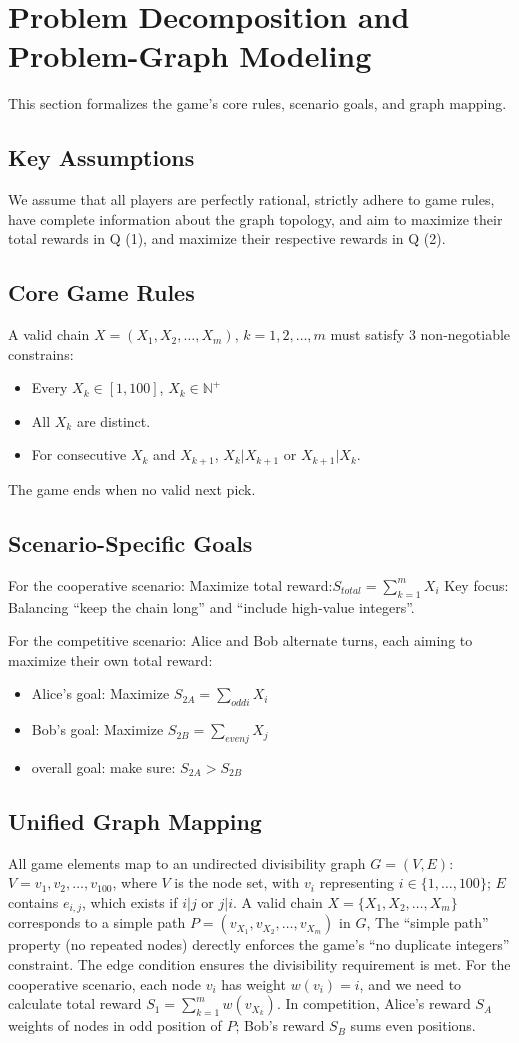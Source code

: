 \documentclass[twocolumn, a4paper]{article}
\begin{document}
\section{Problem Decomposition and Problem-Graph Modeling}
This section formalizes the game's core rules, scenario goals, and graph mapping. 
\subsection{Key Assumptions}
We assume that all players are perfectly rational, strictly adhere to game rules, have complete information about the graph topology, and aim to maximize their total rewards in Q (1), and maximize their respective rewards in Q (2).
\subsection{Core Game Rules}
A valid chain $X=(X_1, X_2, \dots, X_m)$, $k=1, 2, \dots,m$ must satisfy 3 non-negotiable constrains:
\begin{itemize}
    \item Every $X_k\in [1, 100]$, $X_k\in \mathbb{N} ^+$
    \item All $X_k$ are distinct.
    \item For consecutive $X_k$ and $X_{k+1}$, $X_k | X_{k+1}$ or $X_{k+1} | X_k$.
\end{itemize}
The game ends when no valid next pick.
\subsection{Scenario-Specific Goals}
For the cooperative scenario: Maximize total reward:$S_{total}=\sum_{k=1}^{m}X_i$
Key focus: Balancing ``keep the chain long'' and ``include high-value integers''.

For the competitive scenario: Alice and Bob alternate turns, each aiming to maximize their own total reward:
\begin{itemize}
    \item Alice's goal: Maximize $S_{2A}=\sum_{odd i}X_i$
    \item Bob's goal: Maximize $S_{2B}=\sum_{even j}X_j$
    \item overall goal: make sure: $S_{2A}>S_{2B}$
\end{itemize}
\subsection{Unified Graph Mapping}
All game elements map to an undirected divisibility graph $G=(V, E)$: $V={v_1, v_2, \dots,v_{100}}$, where $V$ is the node set, with $v_i$ representing $i\in \{1, \dots, 100\}$; $E$ contains $e_{i,j}$, which exists if $i | j$ or $j | i$.
A valid chain $X=\{X_1, X_2, \dots, X_m\}$ corresponds to a simple path $P=(v_{X_1}, v_{X_2}, \dots, v_{X_m})$ in $G$, The ``simple path'' property (no repeated nodes) derectly enforces the game's ``no duplicate integers'' constraint. The edge condition ensures the divisibility requirement is met. 
For the cooperative scenario, each node $v_i$ has weight $w(v_i)=i$, and we need to calculate total reward $S_1=\sum_{k=1}^{m}w(v_{X_k})$. In competition, Alice's reward $S_A$ weights of nodes in odd position of $P$; Bob's reward $S_B$ sums even positions.
\end{document}
